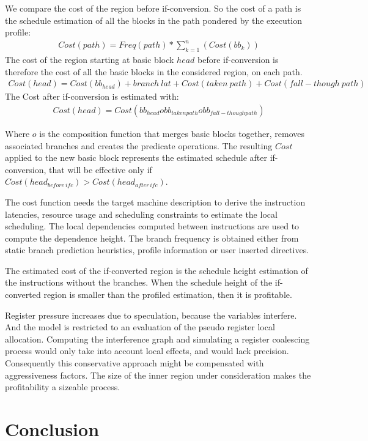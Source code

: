 We compare the cost of the region before if-conversion. So the cost of a path is the schedule estimation of all the blocks in the path pondered by the execution profile:
\begin{align}
Cost(path)=Freq(path)*\sum_{k=1}^n(Cost(bb_{k}))
\end{align}
The cost of the region starting at basic block $head$ before if-conversion is therefore the cost of all the basic blocks in the considered region, on each path.
\begin{align}
Cost(head)=Cost(bb_{head})+branch\:lat+Cost(taken\:path)+Cost(fall-though\:path)
\end{align}
The Cost after if-conversion is estimated with:
\begin{align}
Cost(head)=Cost(bb_{head} o bb_{taken path} o bb_{fall-though path})
\end{align}

Where $o$ is the composition function that merges basic blocks together, removes associated branches and creates the predicate operations. The resulting $Cost$ applied to the new basic block represents the estimated schedule after if-conversion, that will be effective only if $Cost(head_{before\,ifc}) > Cost(head_{after\,ifc})$. 
 
The cost function needs the target machine description to derive the instruction latencies, resource usage and scheduling constraints to estimate the local scheduling. The local dependencies computed between instructions are used to compute the dependence height. The branch frequency is obtained either from static branch prediction heuristics, profile information or user inserted directives.

The estimated cost of the if-converted region is the schedule height estimation of the instructions without the branches. When the schedule height of the if-converted region is smaller than the profiled estimation, then it is profitable.

Register pressure increases due to speculation, because the variables interfere. And the model is restricted to an evaluation of the pseudo register local allocation. Computing the interference graph and simulating a register coalescing process would only take into account local effects, and would lack precision. Consequently this conservative approach might be compensated with aggressiveness factors. The size of the inner region under consideration makes the profitability a sizeable process.

\section{Conclusion} 

